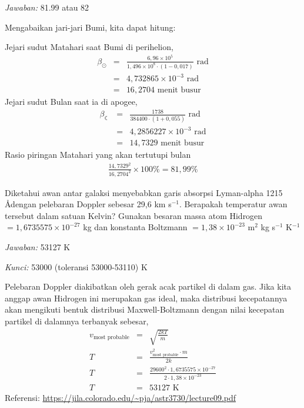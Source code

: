\documentclass[11pt,fleqn]{exam}
\newcommand*{\kms}{km s\ensuremath{^{-1}}}
\begin{document}
\begin{questions}
\bigskip
\textit{Jawaban: } 81.99 atau 82

Mengabaikan jari-jari Bumi, kita dapat hitung:

Jejari sudut Matahari saat Bumi di perihelion,
\begin{eqnarray*}
    \beta_\odot &=& \frac{6,96 \times 10^5}{1,496 \times 10^8 \cdot (1 - 0,017)} \text{  rad}\\
    &=& 4,732865 \times 10^{-3} \text{  rad}\\ 
    &=& 16,2704 \text{ menit busur}
\end{eqnarray*}
Jejari sudut Bulan saat ia di apogee,
\begin{eqnarray*}
    \beta_{\leftmoon} &=& \frac{1738}{384400 \cdot(1 + 0,055)} \text{  rad}\\
    &=& 4,2856227 \times 10^{-3} \text{  rad}\\
    &=& 14,7329 \text{ menit busur}
\end{eqnarray*}
Rasio piringan Matahari yang akan tertutupi bulan
\begin{eqnarray*}
    \frac{14,7329^2}{16,2704^2} \times 100\% = 81,99\%
\end{eqnarray*}

\vspace{0.5cm}
\question Diketahui awan antar galaksi menyebabkan garis absorpsi Lyman-alpha 1215 \AA dengan pelebaran Doppler sebesar 29,6 \kms. Berapakah temperatur awan tersebut dalam satuan Kelvin? Gunakan besaran massa atom Hidrogen $=1,6735575 \times 10^{-27}$ kg dan konstanta Boltzmann $=1,38 \times 10^{-23}$ m$^2$ kg s$^{-1}$ K$^{-1}$

\bigskip
\textit{Jawaban: } 53127 K 

\textit{Kunci: } 53000 (toleransi 53000-53110) K

Pelebaran Doppler diakibatkan oleh gerak acak partikel di dalam gas. Jika kita anggap awan Hidrogen ini merupakan gas ideal, maka distribusi kecepatannya akan  mengikuti bentuk distribusi Maxwell-Boltzmann dengan nilai kecepatan partikel di dalamnya terbanyak sebesar,
\begin{eqnarray*}
    v_\text{most probable} &=& \sqrt{\frac{2 k T}{ m}}\\
    T &=& \frac{v_\text{most probable}^2 \cdot m}{2 k}\\
    T &=& \frac{29600^2 \cdot 1,6735575 \times 10^{-27}}{2 \cdot 1,38 \times 10^{-23}}\\
    T &=& 53127 \text{ K}
\end{eqnarray*}
Referensi: \url{https://jila.colorado.edu/~pja/astr3730/lecture09.pdf}


\end{questions}
\end{document}
